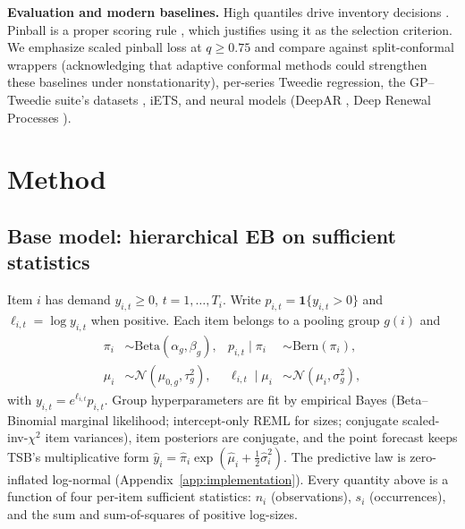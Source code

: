 \documentclass[twocolumn,10pt]{article}
\newcommand{\ind}[1]{\mathbf{1}\{#1\}}
\begin{document}
\textbf{Evaluation and modern baselines.} High quantiles drive inventory
decisions \citep{kolassa2016}. Pinball is a proper scoring rule
\citep{gneiting2007}, which justifies using it as the selection
criterion. We emphasize scaled pinball loss \citep{makridakis2022} at
$q\ge0.75$ and compare against split-conformal wrappers \citep{lei2018}
(acknowledging that adaptive conformal methods
\citep{gibbs2021} could strengthen these baselines under
nonstationarity), per-series Tweedie regression, the GP--Tweedie suite's
datasets \citep{damato2025}, iETS, and neural models (DeepAR
\citep{salinas2020}, Deep Renewal Processes \citep{turkmen2019}).

\section{Method}\label{sec:method}

\subsection{Base model: hierarchical EB on sufficient statistics}
\label{sec:base}
Item $i$ has demand $y_{i,t}\ge0$, $t=1,\dots,T_i$. Write
$p_{i,t}=\ind{y_{i,t}>0}$ and $\ell_{i,t}=\log y_{i,t}$ when positive.
Each item belongs to a pooling group $g(i)$ and
\begin{align}
\pi_i &\sim \mathrm{Beta}(\alpha_g,\beta_g), &
p_{i,t}\mid\pi_i &\sim \mathrm{Bern}(\pi_i),\nonumber\\
\mu_i &\sim \mathcal{N}(\mu_{0,g},\tau^2_g), &
\ell_{i,t}\mid\mu_i &\sim \mathcal{N}(\mu_i,\sigma^2_g),
\label{eq:model}
\end{align}
with $y_{i,t}=e^{\ell_{i,t}}p_{i,t}$. Group hyperparameters are fit by
empirical Bayes (Beta--Binomial marginal likelihood; intercept-only REML
for sizes; conjugate scaled-inv-$\chi^2$ item variances), item posteriors
are conjugate, and the point forecast keeps TSB's multiplicative form
$\hat y_i=\hat\pi_i\exp(\hat\mu_i+\tfrac12\hat\sigma^2_i)$. The predictive
law is zero-inflated log-normal
(Appendix~\ref{app:implementation}). Every quantity above is a
function of four per-item sufficient statistics:
$n_i$ (observations), $s_i$ (occurrences), and the sum and sum-of-squares
of positive log-sizes.
\end{document}
